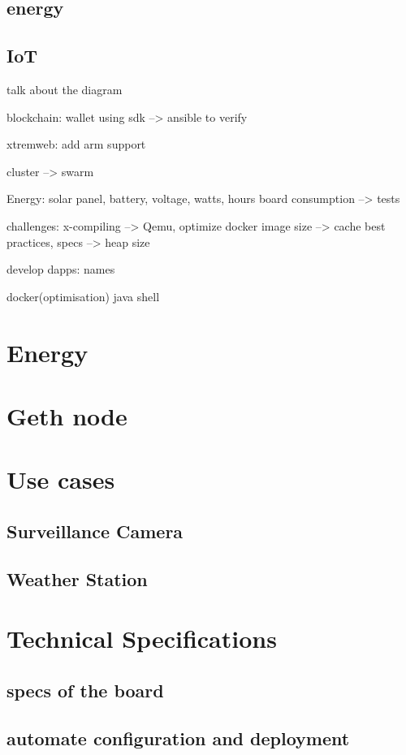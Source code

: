     \subsection{energy}
    \subsection{IoT}

    talk about the diagram
    
    blockchain: wallet using sdk --> ansible to verify
    
    xtremweb: add arm support

    cluster --> swarm
    
    Energy: solar panel, battery, voltage, watts, hours board consumption --> tests

    challenges: x-compiling --> Qemu, optimize docker image size --> cache best practices, specs --> heap size
    
    develop dapps: names

    docker(optimisation) java shell 

\section{Energy}

\section{Geth node}

\section{Use cases}
    \subsection{Surveillance Camera}
    \subsection{Weather Station}


\section{Technical Specifications}
    \subsection{specs of the board}
    \subsection{automate configuration and deployment}
